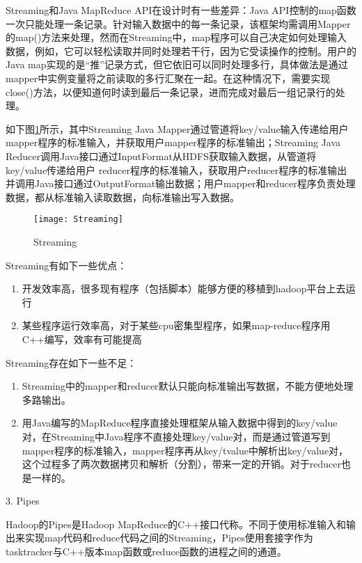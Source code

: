 Streaming和Java MapReduce API在设计时有一些差异：Java API控制的map函数一次只能处理一条记录。针对输入数据中的每一条记录，该框架均需调用Mapper的map()方法来处理，然而在Streaming中，map程序可以自己决定如何处理输入数据，例如，它可以轻松读取并同时处理若干行，因为它受读操作的控制。用户的Java map实现的是“推”记录方式，但它依旧可以同时处理多行，具体做法是通过mapper中实例变量将之前读取的多行汇聚在一起。在这种情况下，需要实现close()方法，以便知道何时读到最后一条记录，进而完成对最后一组记录行的处理。

如下图\ref{fig:Streaming}所示，其中Streaming Java Mapper通过管道将key/value输入传递给用户mapper程序的标准输入，并获取用户mapper程序的标准输出；Streaming Java Reducer调用Java接口通过InputFormat从HDFS获取输入数据，从管道将key/value传递给用户 reducer程序的标准输入，获取用户reducer程序的标准输出并调用Java接口通过OutputFormat输出数据；用户mapper和reducer程序负责处理数据，都从标准输入读取数据，向标准输出写入数据。


\begin{figure}[h]
 \centering
 \texttt{[image: Streaming]}
 \caption{Streaming}
 \label{fig:Streaming}
\end{figure}


Streaming有如下一些优点： 

\begin{enumerate}
\item 开发效率高，很多现有程序（包括脚本）能够方便的移植到hadoop平台上去运行 

\item 某些程序运行效率高，对于某些cpu密集型程序，如果map-reduce程序用C++编写，效率有可能提高 
\end{enumerate}

Streaming存在如下一些不足：

\begin{enumerate}
\item Streaming中的mapper和reducer默认只能向标准输出写数据，不能方便地处理多路输出。 

\item 用Java编写的MapReduce程序直接处理框架从输入数据中得到的key/value对，在Streaming中Java程序不直接处理key/value对，而是通过管道写到mapper程序的标准输入，mapper程序再从key/tvalue中解析出key/value对，这个过程多了两次数据拷贝和解析（分割），带来一定的开销。对于reducer也是一样的。
\end{enumerate}

3. Pipes

Hadoop的Pipes是Hadoop MapReduce的C++接口代称。不同于使用标准输入和输出来实现map代码和reduce代码之间的Streaming，Pipes使用套接字作为tasktracker与C++版本map函数或reduce函数的进程之间的通道。

